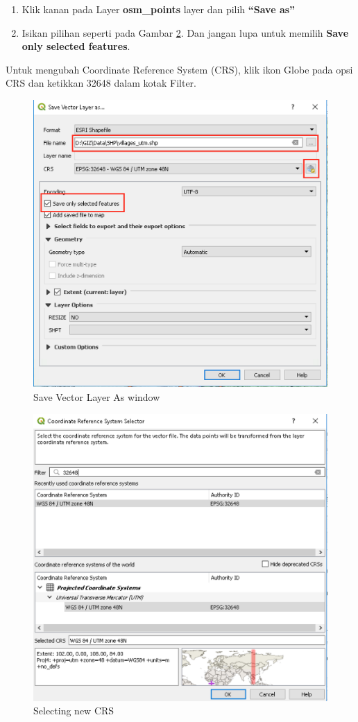 \documentclass[]{book}
\begin{document}
\begin{enumerate}
\def\labelenumi{\arabic{enumi}.}
\setcounter{enumi}{4}
\item
  Klik kanan pada Layer \textbf{osm\_points} layer dan pilih \textbf{``Save as''}
\item
  Isikan pilihan seperti pada Gambar \ref{fig:fig1428}. Dan jangan lupa untuk memilih \textbf{Save only selected features}.
\end{enumerate}

Untuk mengubah Coordinate Reference System (CRS), klik ikon Globe pada opsi CRS dan ketikkan 32648 dalam kotak Filter.

\begin{figure}

{\centering \includegraphics[width=0.7\linewidth]{images/04/fig29} 

}

\caption{Save Vector Layer As window}\label{fig:fig1429}
\end{figure}

\begin{figure}

{\centering \includegraphics[width=0.7\linewidth]{images/04/fig28} 

}

\caption{Selecting new CRS}\label{fig:fig1428}
\end{figure}
\end{document}
